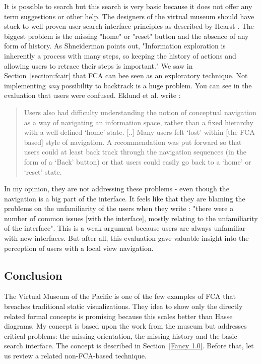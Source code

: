 \documentclass[11pt]{report}
\begin{document}
It is possible to search but this search is very basic because it does not offer any term suggestions or other help. The designers of the virtual museum should have stuck to well-proven user search interface principles as described by Hearst \cite{Hearst2009}. The biggest problem is the missing "home" or "reset" button and the absence of any form of history. As Shneiderman \cite{Shneiderman1996} points out, "Information exploration is inherently a process with many steps, so keeping the history of actions and allowing users to retrace their steps is important." We saw in Section~\ref{section:fcair} that FCA can bee seen as an exploratory technique. Not implementing \textit{any} possibility to backtrack is a huge problem. You can see in the evaluation that users were confused. Eklund et al. write \cite{Eklund2012}:
 \begin{quote}
 Users also had difficulty understanding the notion of conceptual navigation as a way of navigating an information space, rather than a fixed hierarchy with a well defined `home' state. [..] Many users felt `lost' within [the FCA-based] style of navigation. A recommendation was put forward so that users could at least back track through the navigation sequences (in the form of a `Back' button) or that users could easily go back to a `home' or `reset' state.
 \end{quote}
  In my opinion, they are not addressing these problems - even though the navigation is a big part of the interface. It feels like that they are blaming the problems on the unfamiliarity of the users when they write \cite{Eklund2012}: "there were a number of common issues [with the interface], mostly relating to the unfamiliarity of the interface". This is a weak argument because users are always unfamiliar with new interfaces. But after all, this evaluation gave valuable insight into the perception of users with a local view navigation.
  
\subsection{Conclusion}

The Virtual Museum of the Pacific is one of the few examples of FCA that breaches traditional static visualizations. They idea to show only the directly related formal concepts is promising because this scales better than Hasse diagrams. My concept is based upon the work from the museum but addresses critical problems: the missing orientation, the missing history and the basic search interface. The concept is described in Section~\ref{Fancy 1.0}. Before that, let us review a related non-FCA-based technique.
\end{document}
